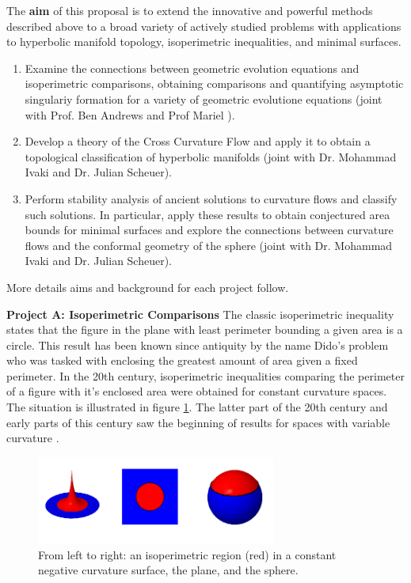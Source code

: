 \documentclass[12pt]{amsart}
\begin{document}
The \textbf{aim} of this proposal is to extend the innovative and powerful methods described above to a broad variety of actively studied problems with applications to hyperbolic manifold topology, isoperimetric inequalities, and minimal surfaces.

\begin{enumerate}[label=\textbf{(\Alph*)}]
\item Examine the connections between geometric evolution equations and isoperimetric comparisons, obtaining comparisons and quantifying asymptotic singulariy formation for a variety of geometric evolutione equations (joint with Prof. Ben Andrews and Prof Mariel \saez{}).
\item Develop a theory of the Cross Curvature Flow and apply it to obtain a topological classification of hyperbolic manifolds (joint with Dr. Mohammad Ivaki and Dr. Julian Scheuer).
\item Perform stability analysis of ancient solutions to curvature flows and classify such solutions. In particular, apply these results to obtain conjectured area bounds for minimal surfaces and explore the connections between curvature flows and the conformal geometry of the sphere (joint with Dr. Mohammad Ivaki and Dr. Julian Scheuer).
\end{enumerate}

\noindent More details aims and background for each project follow.

\noindent\textbf{Project A: Isoperimetric Comparisons}
\label{sec-2-1}
The classic isoperimetric inequality states that the figure in the plane with least perimeter bounding a given area is a circle. This result has been known since antiquity by the name Dido's problem who was tasked with enclosing the greatest amount of area given a fixed perimeter. In the 20th century, isoperimetric inequalities comparing the perimeter of a figure with it's enclosed area were obtained for constant curvature spaces. The situation is illustrated in figure \ref{fg:const_curve_isoperimetric}. The latter part of the 20th century and early parts of this century saw the beginning of results for spaces with variable curvature \cite{MR1699261,MR1661278,MR1883725,MR1417620}.

\begin{figure}[htb]
\centering
\includegraphics[width=0.7\textwidth]{img/const_curve.png}
\caption{\label{fg:const_curve_isoperimetric}From left to right: an isoperimetric region (red) in a constant negative curvature surface, the plane, and the sphere.}
\end{figure}
\end{document}
